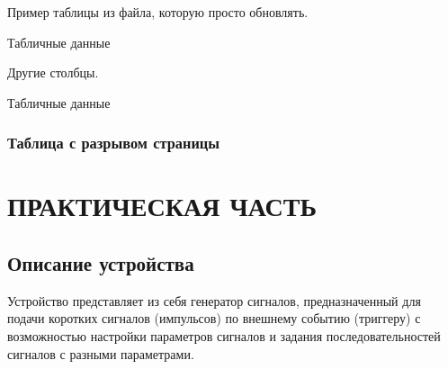 \documentclass[rusmathsym, eqnumwithinsec, amspack, hyperref]{bomgost}
\begin{document}
Пример таблицы из файла, которую просто обновлять.


\begin{gosttable}
    \begin{table}[H]
        \centering
        \caption{Табличные данные}
        \pgfplotstabletypeset[columns={id,num}]{\loadedtable}
    \end{table}
\end{gosttable}

Другие столбцы.

\begin{gosttable}
  \begin{table}[H]
      \centering
      \caption{Табличные данные}
      \pgfplotstabletypeset[columns={id,text}]{\loadedtable}
  \end{table}
\end{gosttable}

\subsubsection{Таблица с разрывом страницы}
\begin{gosttable}
  \pgfplotstabletypeset[font=\small
  ,begin table = \begin{longtable}
  ,end table = \end{longtable}
  ,every head row/.append style={before  row={%
  \caption{Таблица с разрывом}
  \label{tab:long_table}\\
  \hline
  \endfirsthead
  \caption*{Продолжение таблицы~\cref{tab:long_table}}\\
  \hline 
  col 1 & col 2 & col 3\\
  \hline
  \endhead
  }
  }
  ,every first row/.append style={before row ={
    col 1 & col 2 & col 3\\
  \hline
  }
  }
  , columns={id,num,text}
  ]{\loadedtable}
\end{gosttable}

%
%
\section{ПРАКТИЧЕСКАЯ ЧАСТЬ}
\subsection{Описание устройства}

Устройство представляет из себя генератор сигналов, предназначенный для подачи коротких сигналов (импульсов) по внешнему событию (триггеру) с возможностью настройки параметров сигналов и задания последовательностей сигналов с разными параметрами.
\end{document}
